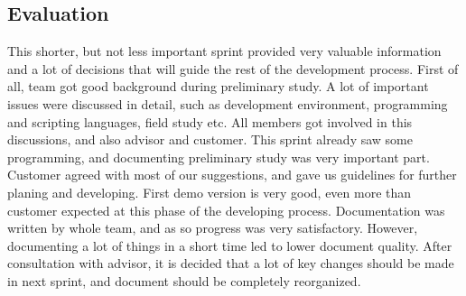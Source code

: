 \subsection{Evaluation}
	This shorter, but not less important sprint provided very valuable information and a lot of decisions that will guide the rest of the development process. First of all, team got good background during preliminary study. A lot of important issues were discussed in detail, such as development environment, programming and scripting languages, field study etc. All members got involved in this discussions, and also advisor and customer. This sprint already saw some programming, and documenting preliminary study was very important part.\newline
	Customer agreed with most of our suggestions, and gave us guidelines for further planing and developing. First demo version is very good, even more than customer expected at this phase of the developing process.\newline
	Documentation was written by whole team, and as so progress was very satisfactory. However, documenting a lot of things in a short time led to lower document quality. After consultation with advisor, it is decided that a lot of key changes should be made in next sprint, and document should be completely reorganized.
